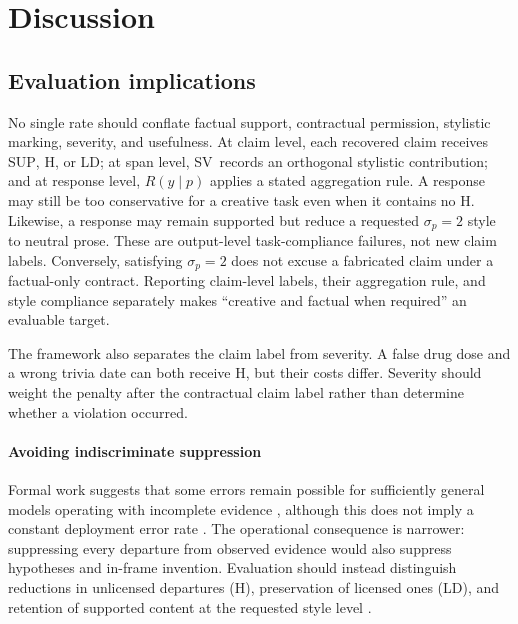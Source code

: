 \documentclass{clv2025}
\newcommand{\LD}{\textsc{LD}}
\newcommand{\Hall}{\textsc{H}}
\newcommand{\SUP}{\textsc{SUP}}
\newcommand{\SV}{\textsc{SV}}
\begin{document}
\section{Discussion}\label{sec:discussion}

\subsection{Evaluation implications}

No single rate should conflate factual support, contractual permission, stylistic marking, severity, and usefulness.
At claim level, each recovered claim receives \SUP, \Hall, or \LD; at span level, \SV\ records an orthogonal stylistic contribution; and at response level, $R(y\mid p)$ applies a stated aggregation rule.
A response may still be too conservative for a creative task even when it contains no \Hall.
Likewise, a response may remain supported but reduce a requested $\sigma_p=2$ style to neutral prose.
These are output-level task-compliance failures, not new claim labels.
Conversely, satisfying $\sigma_p=2$ does not excuse a fabricated claim under a factual-only contract.
Reporting claim-level labels, their aggregation rule, and style compliance separately makes ``creative and factual when required'' an evaluable target.

The framework also separates the claim label from severity.
A false drug dose and a wrong trivia date can both receive \Hall, but their costs differ.
Severity should weight the penalty after the contractual claim label rather than determine whether a violation occurred.

\paragraph{Avoiding indiscriminate suppression}
Formal work suggests that some errors remain possible for sufficiently general models operating with incomplete evidence \citep{kalai_calibrated_2024,xu_hallucination_2024,banerjee_llms_2024}, although this does not imply a constant deployment error rate \citep{suzuki_negligible_2025}.
The operational consequence is narrower: suppressing every departure from observed evidence would also suppress hypotheses and in-frame invention.
Evaluation should instead distinguish reductions in unlicensed departures (\Hall), preservation of licensed ones (\LD), and retention of supported content at the requested style level \citep{banerjee_does_2025,sun_hallucinating_2024,he_shakespearean_2025}.
\end{document}
